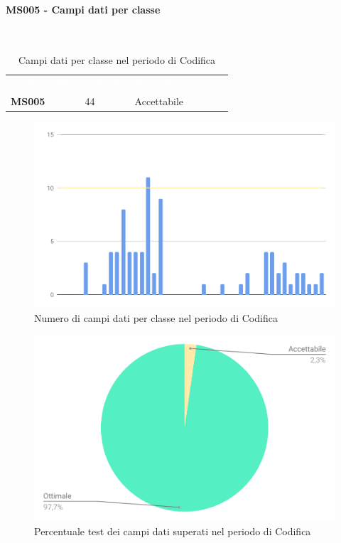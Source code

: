 \paragraph{MS005 - Campi dati per classe}\mbox{}\\[0,3cm]
    \begin{table}[H]
        \centering
        \begin{tabular}{ccccccc}
            \rowcolor{greySWEight}
            \textcolor{white}{\textbf{Codice}} &
            \textcolor{white}{\textbf{File analizzati}}&
            \textcolor{white}{\textbf{Riscontro}}\\
            \textbf{MS005} & 44 & \textcolor{YellowOrange}{Accettabile}\\
        \end{tabular}
        \caption{Campi dati per classe nel periodo di Codifica}
    \end{table}
    \begin{figure}[H]
        \centering
        \includegraphics[width=0.7\linewidth]{sez/App_Esito/Qualifica/graph/campiDatiPerClasse.pdf}
        \caption{Numero di campi dati per classe nel periodo di Codifica}
    \end{figure}
    \begin{figure}[H]
        \centering
        \includegraphics[width=0.7\linewidth]{sez/App_Esito/Qualifica/graph/campiDatiPerClasseTorta.pdf}
        \caption{Percentuale test dei campi dati superati nel periodo di Codifica}
    \end{figure}

